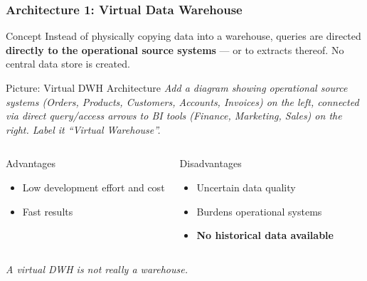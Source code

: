 \begin{frame}
  \frametitle{Architecture 1: Virtual Data Warehouse}

  \begin{block}{Concept}
    Instead of physically copying data into a warehouse, queries are directed
    \textbf{directly to the operational source systems} --- or to extracts thereof.
    No central data store is created.
  \end{block}

  \begin{alertblock}{Picture: Virtual DWH Architecture}
    \textit{Add a diagram showing operational source systems (Orders, Products,
    Customers, Accounts, Invoices) on the left, connected via direct
    query/access arrows to BI tools (Finance, Marketing, Sales) on the right.
    Label it ``Virtual Warehouse''.}
  \end{alertblock}

  \begin{columns}[T]
    \begin{block}{Advantages}
      \begin{itemize}
        \item Low development effort and cost
        \item Fast results
      \end{itemize}
    \end{block}

    \begin{alertblock}{Disadvantages}
      \begin{itemize}
        \item Uncertain data quality
        \item Burdens operational systems
        \item \textbf{No historical data available}
      \end{itemize}
    \end{alertblock}
  \end{columns}

  \vspace{0.3em}
  \textit{A virtual DWH is not really a warehouse.}
\end{frame}


